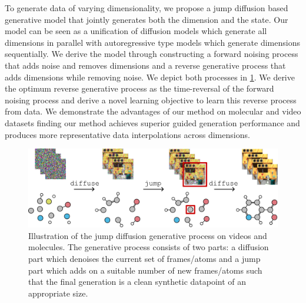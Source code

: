 To generate data of varying dimensionality, we propose a jump diffusion based generative model that jointly generates both the dimension and the state. Our model can be seen as a unification of diffusion models which generate all dimensions in parallel with autoregressive type models which generate dimensions sequentially. We derive the model through constructing a forward noising process that adds noise and removes dimensions and a reverse generative process that adds dimensions while removing noise. We depict both processes in \cref{fig:tddm-fig1}. We derive the optimum reverse generative process as the time-reversal of the forward noising process and derive a novel learning objective to learn this reverse process from data. We demonstrate the advantages of our method on molecular and video datasets finding our method achieves superior guided generation performance and produces more representative data interpolations across dimensions.

\begin{figure}
    \centering
    \includegraphics[width=\textwidth]{figs/tddm/fig1.pdf}
    \caption{Illustration of the jump diffusion generative process on videos and molecules. The generative process consists of two parts: a diffusion part which denoises the current set of frames/atoms and a jump part which adds on a suitable number of new frames/atoms such that the final generation is a clean synthetic datapoint of an appropriate size.
    }
    \label{fig:tddm-fig1}
\end{figure}


